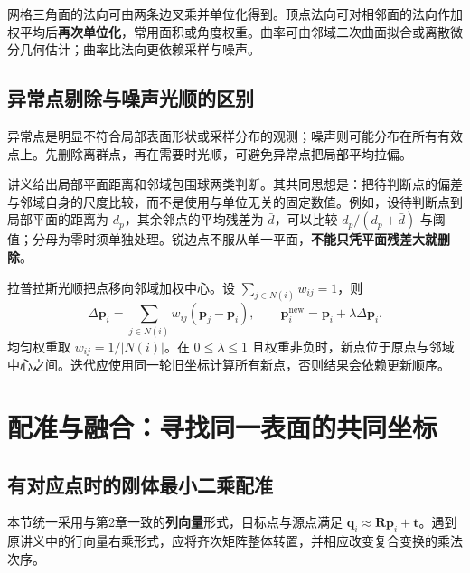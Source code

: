 网格三角面的法向可由两条边叉乘并单位化得到。顶点法向可对相邻面的法向作加权平均后\textbf{再次单位化}，常用面积或角度权重。曲率可由邻域二次曲面拟合或离散微分几何估计；曲率比法向更依赖采样与噪声。

\subsection{异常点剔除与噪声光顺的区别}
异常点是明显不符合局部表面形状或采样分布的观测；噪声则可能分布在所有有效点上。先删除离群点，再在需要时光顺，可避免异常点把局部平均拉偏。

讲义给出局部平面距离和邻域包围球两类判断。其共同思想是：把待判断点的偏差与邻域自身的尺度比较，而不是使用与单位无关的固定数值。例如，设待判断点到局部平面的距离为 $d_p$，其余邻点的平均残差为 $\bar d$，可以比较 $d_p/(d_p+\bar d)$ 与阈值；分母为零时须单独处理。锐边点不服从单一平面，\textbf{不能只凭平面残差大就删除}。

拉普拉斯光顺把点移向邻域加权中心。设 $\sum_{j\in N(i)}w_{ij}=1$，则
\[
\Delta\mathbf p_i=\sum_{j\in N(i)}w_{ij}
(\mathbf p_j-\mathbf p_i),\qquad
\boxed{\mathbf p_i^{\mathrm{new}}=\mathbf p_i+\lambda\Delta\mathbf p_i}.
\]
均匀权重取 $w_{ij}=1/|N(i)|$。在 $0\leq\lambda\leq1$ 且权重非负时，新点位于原点与邻域中心之间。迭代应使用同一轮旧坐标计算所有新点，否则结果会依赖更新顺序。



\section{配准与融合：寻找同一表面的共同坐标}
\subsection{有对应点时的刚体最小二乘配准}
本节统一采用与第2章一致的\textbf{列向量}形式，目标点与源点满足 $\mathbf q_i\approx\mathbf R\mathbf p_i+\mathbf t$。遇到原讲义中的行向量右乘形式，应将齐次矩阵整体转置，并相应改变复合变换的乘法次序。

